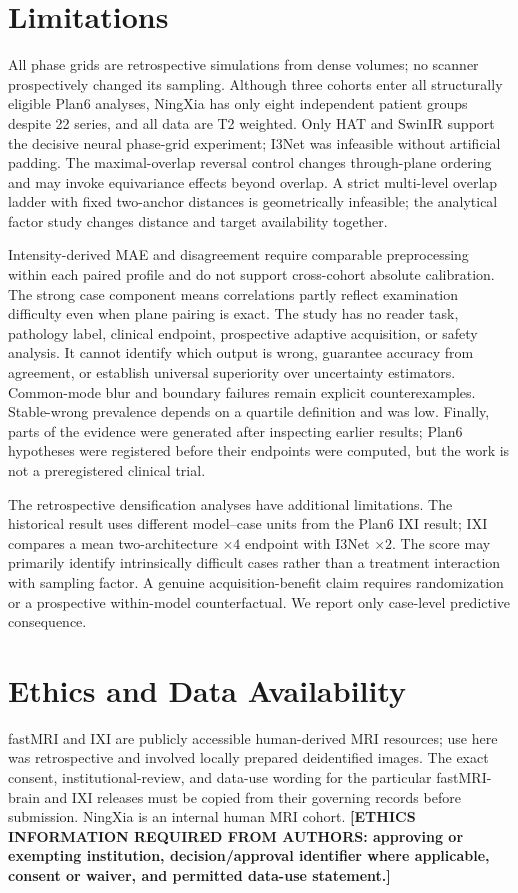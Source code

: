 \documentclass[journal,10pt]{IEEEtran}
\begin{document}
\section{Limitations}
All phase grids are retrospective simulations from dense volumes; no scanner prospectively changed its sampling. Although three cohorts enter all structurally eligible Plan6 analyses, NingXia has only eight independent patient groups despite 22 series, and all data are T2 weighted. Only HAT and SwinIR support the decisive neural phase-grid experiment; I3Net was infeasible without artificial padding. The maximal-overlap reversal control changes through-plane ordering and may invoke equivariance effects beyond overlap. A strict multi-level overlap ladder with fixed two-anchor distances is geometrically infeasible; the analytical factor study changes distance and target availability together.

Intensity-derived MAE and disagreement require comparable preprocessing within each paired profile and do not support cross-cohort absolute calibration. The strong case component means correlations partly reflect examination difficulty even when plane pairing is exact. The study has no reader task, pathology label, clinical endpoint, prospective adaptive acquisition, or safety analysis. It cannot identify which output is wrong, guarantee accuracy from agreement, or establish universal superiority over uncertainty estimators. Common-mode blur and boundary failures remain explicit counterexamples. Stable-wrong prevalence depends on a quartile definition and was low. Finally, parts of the evidence were generated after inspecting earlier results; Plan6 hypotheses were registered before their endpoints were computed, but the work is not a preregistered clinical trial.

The retrospective densification analyses have additional limitations. The historical result uses different model--case units from the Plan6 IXI result; IXI compares a mean two-architecture $\times4$ endpoint with I3Net $\times2$. The score may primarily identify intrinsically difficult cases rather than a treatment interaction with sampling factor. A genuine acquisition-benefit claim requires randomization or a prospective within-model counterfactual. We report only case-level predictive consequence.

\section{Ethics and Data Availability}
fastMRI and IXI are publicly accessible human-derived MRI resources; use here was retrospective and involved locally prepared deidentified images. The exact consent, institutional-review, and data-use wording for the particular fastMRI-brain and IXI releases must be copied from their governing records before submission. NingXia is an internal human MRI cohort. \textbf{[ETHICS INFORMATION REQUIRED FROM AUTHORS: approving or exempting institution, decision/approval identifier where applicable, consent or waiver, and permitted data-use statement.]}
\end{document}
